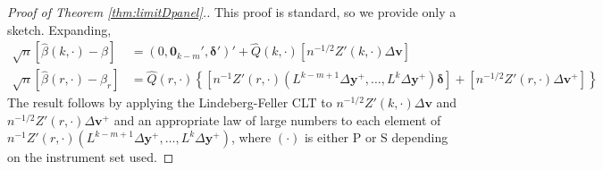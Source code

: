 \begin{proof}[Proof of Theorem \ref{thm:limitDpanel}.]
  This proof is standard, so we provide only a sketch.
Expanding, 
\begin{align*}
  \sqrt{n}\left[\widehat{\beta}(k,\cdot) - \beta\right] &=(0, \mathbf{0}_{k-m}', \boldsymbol{\delta}')' + \widehat{Q}(k,\cdot)\left[ n^{-1/2}Z'(k,\cdot)\Delta \mathbf{v}\right]\\
  \sqrt{n}\left[\widehat{\beta}(r,\cdot) - \beta_{r}\right] &=  \widehat{Q}(r,\cdot)\left\{  \left[n^{-1}Z'(r,\cdot)( L^{k-m+1}\Delta \mathbf{y}^+ , \ldots,  L^{k}\Delta \mathbf{y}^+)\boldsymbol{\delta}\right] + \left[n^{-1/2}Z'(r,\cdot)\Delta \mathbf{v}^{+}\right] \right\}
\end{align*}
The result follows by applying the Lindeberg-Feller CLT to $n^{-1/2}Z'(k,\cdot)\Delta \mathbf{v}$ and $n^{-1/2}Z'(r,\cdot)\Delta \mathbf{v}^{+}$ and an appropriate law of large numbers to each element of $n^{-1} Z'(r,\cdot)(L^{k-m+1} \Delta \mathbf{y}^{+}, \ldots, L^k \Delta \mathbf{y}^{+})$, where $(\cdot)$ is either $\text{P}$ or $\text{S}$ depending on the instrument set used.
\end{proof}


